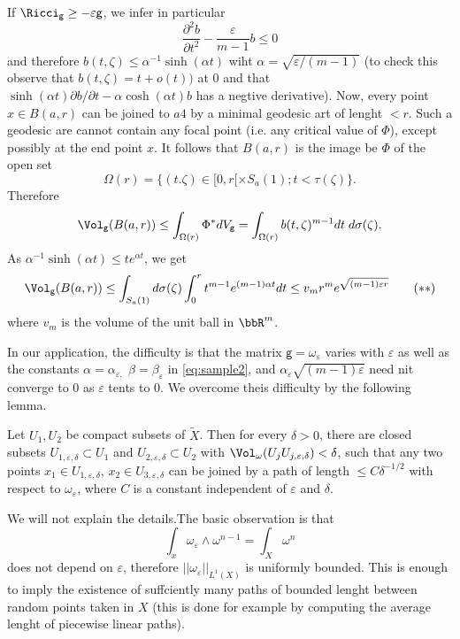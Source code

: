 If $\Ricci_{\mathsf{g}} \geq -\varepsilon\mathsf{g}$, we infer in particular
$$
\dfrac{\partial^{2}b}{\partial t^{2}} - \dfrac{\varepsilon}{m-1} b\leq 0
$$
and therefore $b(t, \zeta) \leq \alpha^{-1} \sinh(\alpha t)$ wiht $\alpha = \sqrt{\varepsilon/(m-1)}$ (to check this observe that $b(t, \zeta) = t + o(t))$ at 0 and that $\sinh(\alpha t)\partial b/\partial t -\alpha \cosh(\alpha t)b$ has a negtive derivative). Now, every point $x\in B(a, r)$ can be joined to $a4$ by a minimal geodesic art of lenght $< r$. Such a geodesic are cannot contain any focal point (i.e. any critical value of $\Phi$), except possibly at the end point $x$. It follows that $B(a, r)$ is the image be $\Phi$ of the open set
$$
\Omega(r) = \{(t. \zeta) \in [0, r[ \times S_{a}(1); t<\tau (\zeta)\}.
$$
Therefore
$$
\Vol_{\mathsf{g}}(B(a, r)) \leq \int_{\Omega(r)} \Phi^{*}dV_{\mathsf{g}} = \int_{\Omega(r)}b(t, \zeta)^{m-1}dt\; d\sigma(\zeta).
$$
As $\alpha^{-1}\sinh(\alpha t)\leq t e^{\alpha t}$, we get
\begin{equation*}
\Vol_{\mathsf{g}}(B(a, r)) \leq \int_{S_{a}(1)} d\sigma(\zeta) \int_{0}^{r} t^{m-1}e^{(m-1) \alpha t} dt\leq v_{m}r^{m}
e^{\sqrt{(m-1)\varepsilon r}} \tag{$\ast\ast$}\label{eq:sample3}
\end{equation*}
where $v_{m}$ is the volume of the unit ball in $\bbR^{m}$.

In our application, the difficulty is that the matrix $\mathsf{g} = \omega_{\varepsilon}$ varies with $\varepsilon$ as well as the constants $\alpha = \alpha_{\varepsilon,}$  $\beta = \beta_{\varepsilon}$ in \eqref{eq:sample2}, and $\alpha_{\varepsilon}\sqrt{(m-1)\varepsilon}$ need nit converge to 0 as $\varepsilon$ tents to 0. We overcome theis difficulty by the following lemma.

\begin{lem}\label{art5-lemma-2.8}
Let $U_{1}, U_{2}$ be compact subsets of $\widetilde{X}$. Then for every $\delta > 0$, there are closed subsets $U_{1, \varepsilon,\delta} \subset U_{1}$ and $U_{2, \varepsilon, \delta} \subset U_{2}$ with $\Vol_{\omega}(U_{j}U_{j, \varepsilon, \delta})\break < \delta$, such that any two points $x_{1}\in U_{1, \varepsilon, \delta}$, $x_{2} \in U_{3, \varepsilon, \delta}$ can be joined by a path of length $\leq C \delta^{-1/2}$ with respect to $\omega_{\varepsilon}$, where $C$ is a  constant independent of $\varepsilon$ and $\delta$. 
\end{lem}

We will not explain the details.The basic observation is that
$$
\int_{x}\omega_{\varepsilon} \wedge \omega^{n-1} = \int_{X} \omega^{n}
$$
does not depend on $\varepsilon$, therefore $||\omega_{\varepsilon}||_{L^{1} (X)}$ is uniformly bounded. This is enough to imply the existence of suffciently many paths of bounded lenght between random points taken in $X$ (this is done for example by computing the average lenght of piecewise linear paths).

